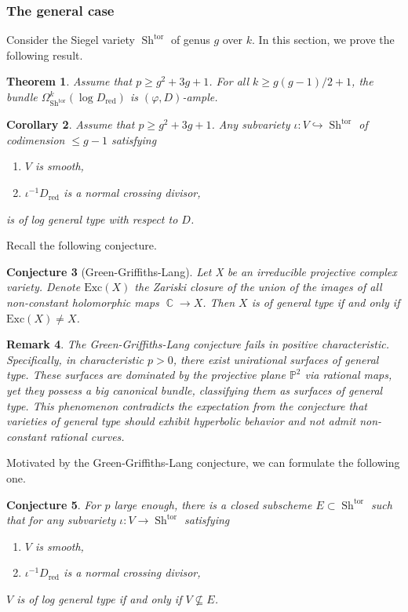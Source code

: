 \documentclass[11pt]{amsart}
\numberwithin{subsection}{section}
\numberwithin{figure}{section}
\numberwithin{table}{section}
\theoremstyle{1}
\newtheorem{theorem}{Theorem}[section]
\newtheorem{conjecture}[theorem]{Conjecture}
\newtheorem{corollary}[theorem]{Corollary}
\theoremstyle{2}
\newtheorem{rmrk}[theorem]{Remark}
\DeclareMathOperator{\C}{\mathbb{C}}
\DeclareMathOperator{\Sh}{Sh}
\DeclareMathOperator{\tor}{tor}
\DeclareMathOperator{\red}{red}
\begin{document}
\subsubsection{The general case}
Consider the Siegel variety $\Sh^{\tor}$ of genus $g$ over $k$. In this section, we prove the following result.
\begin{theorem}\label{th_hyperbolic}
Assume that $p \geq g^2+3g+1$. For all $k \geq g(g-1)/2+1$, the bundle $\Omega^k_{\Sh^{\tor}}(\log D_{\red})$ is $(\varphi,D)$-ample.
\end{theorem}
\begin{corollary}\label{cor_hyperbolic}
Assume that $p \geq g^2+3g+1$. Any subvariety $\iota : V \hookrightarrow \Sh^{\tor}$ of codimension $\leq g-1$ satisfying
\begin{enumerate}
\item $V$ is smooth,
\item $\iota^{-1}D_{\red}$ is a normal crossing divisor,
\end{enumerate}
is of log general type with respect to $D$.
\end{corollary}
\vspace*{0.2cm}
Recall the following conjecture.
\begin{conjecture}[Green-Griffiths-Lang]\label{GGL}
Let X be an irreducible projective complex variety. Denote $\text{Exc}(X)$ the Zariski closure of the union of the images of all non-constant holomorphic maps $\C \rightarrow X$. Then $X$ is of general type if and only if $\text{Exc}(X) \neq  X$.
\end{conjecture}
\begin{rmrk}
The Green-Griffiths-Lang conjecture fails in positive characteristic. Specifically, in characteristic $p > 0$, there exist unirational surfaces of general type. These surfaces are dominated by the projective plane $\mathbb{P}^2$ via rational maps, yet they possess a big canonical bundle, classifying them as surfaces of general type. This phenomenon contradicts the expectation from the conjecture that varieties of general type should exhibit hyperbolic behavior and not admit non-constant rational curves.
\end{rmrk}
\vspace*{0.2cm}
Motivated by the Green-Griffiths-Lang conjecture, we can formulate the following one.
\begin{conjecture}
For $p$ large enough, there is a closed subscheme $E \subset \Sh^{\tor}$ such that for any subvariety $\iota : V \rightarrow \Sh^{\tor}$ satisfying
\begin{enumerate}
\item $V$ is smooth,
\item $\iota^{-1}D_{\red}$ is a normal crossing divisor,
\end{enumerate}
$V$ is of log general type if and only if $V \nsubseteq E$.
\end{conjecture}
\end{document}
